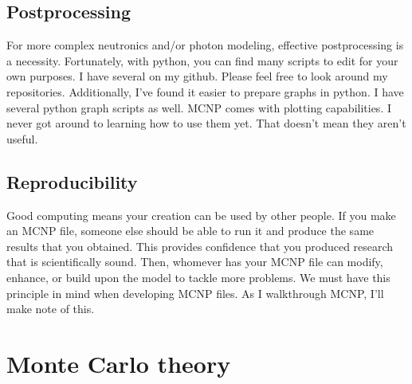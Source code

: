 \documentclass[11pt,a4paper]{article}
\begin{document}
\subsection{Postprocessing}
\noindent For more complex neutronics and/or photon modeling, effective postprocessing is a necessity. Fortunately, with python, you can find many scripts to edit for your own purposes. I have several on my github. Please feel free to look around my repositories. Additionally, I've found it easier to prepare graphs in python. I have several python graph scripts as well. MCNP comes with plotting capabilities. I never got around to learning how to use them yet. That doesn't mean they aren't useful.

\subsection{Reproducibility}
\noindent Good computing means your creation can be used by other people. If you make an MCNP file, someone else should be able to run it and produce the same results that you obtained. This provides confidence that you produced research that is scientifically sound. Then, whomever has your MCNP file can modify, enhance, or build upon the model to tackle more problems. We must have this principle in mind when developing MCNP files. As I walkthrough MCNP, I'll make note of this. 

\newpage


\section{Monte Carlo theory}
\end{document}
